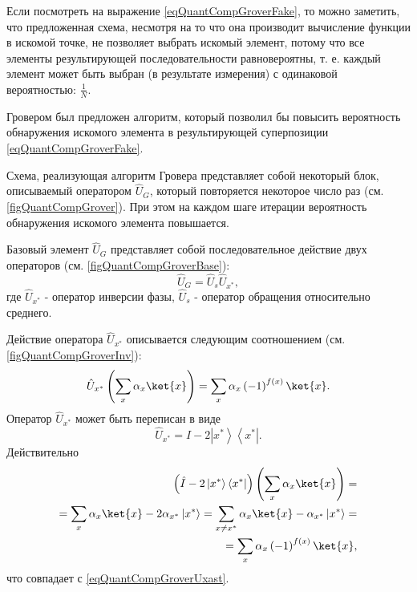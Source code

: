 

Если посмотреть на выражение \eqref{eqQuantCompGroverFake}, то можно
заметить, что предложенная схема, несмотря на то что она производит
вычисление функции в искомой точке, не позволяет выбрать искомый
элемент, потому что все элементы результирующей последовательности
равновероятны, т. е. каждый элемент может быть выбран (в результате
измерения) с одинаковой вероятностью: $\frac{1}{N}$.

Гровером был предложен алгоритм, который позволил бы повысить
вероятность обнаружения искомого элемента в результирующей
суперпозиции \eqref{eqQuantCompGroverFake}.





Схема, реализующая алгоритм Гровера представляет собой некоторый блок,
описываемый оператором $\hat{U}_G$, который повторяется некоторое число
раз (см. \autoref{figQuantCompGrover}). При этом на каждом шаге
итерации вероятность обнаружения искомого элемента повышается. 

Базовый элемент $\hat{U}_G$ представляет собой последовательное действие
двух операторов (см. \autoref{figQuantCompGroverBase}):
\begin{equation}
\hat{U}_G=\hat{U}_s\hat{U}_{x^{\ast}},
\nonumber
\end{equation}
где $\hat{U}_{x^{\ast}}$ - оператор инверсии фазы, $\hat{U}_s$
- оператор обращения относительно среднего.



Действие оператора $\hat{U}_{x^{\ast}}$ описывается следующим соотношением
(см. \autoref{figQuantCompGroverInv}):
\begin{equation}
\hat{U}_{x^{\ast}}\left(\sum_x \alpha_x \ket{x}\right) = 
\sum_x \alpha_x \left(-1\right)^{f\left(x\right)}\ket{x}.
\label{eqQuantCompGroverUxast}
\end{equation} 
Оператор $\hat{U}_{x^{\ast}}$ может быть переписан в виде
\begin{equation}
\hat{U}_{x^{\ast}} = \hat{I} - 2 \left|x^{\ast}\right>\left<x^{\ast}\right|.
\nonumber
\end{equation} 
Действительно
\begin{eqnarray}
\left(\hat{I} - 2 \left|x^{\ast}\right>\left<x^{\ast}\right|\right)
\left(\sum_x \alpha_x \ket{x}\right) =
\nonumber \\
= \sum_x \alpha_x \ket{x} - 2 \alpha_{x^{\ast}}
\left|x^{\ast}\right> = 
\sum_{x\ne x^{\ast}} \alpha_x \ket{x} -  \alpha_{x^{\ast}}
\left|x^{\ast}\right> =
\nonumber \\
=
\sum_x \alpha_x \left(-1\right)^{f\left(x\right)}\ket{x},
\nonumber
\end{eqnarray}
что совпадает с \eqref{eqQuantCompGroverUxast}.

